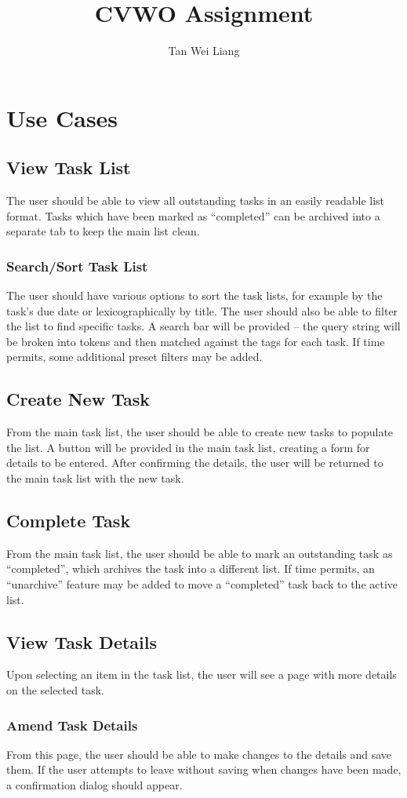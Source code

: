 \documentclass[12pt]{article}
\title{CVWO Assignment}
\author{Tan Wei Liang}
\begin{document}
    \section{Use Cases}
    	\subsection{View Task List}
The user should be able to view all outstanding tasks in an easily readable list format. Tasks which have been marked as “completed” can be archived into a separate tab to keep the main list clean.
    		\subsubsection{Search/Sort Task List}
The user should have various options to sort the task lists, for example by the task’s due date or lexicographically by title.
The user should also be able to filter the list to find specific tasks. A search bar will be provided – the query string will be broken into tokens and then matched against the tags for each task. 
If time permits, some additional preset filters may be added.
		\subsection{Create New Task}
From the main task list, the user should be able to create new tasks to populate the list. A button will be provided in the main task list, creating a form for details to be entered. After confirming the details, the user will be returned to the main task list with the new task.
		\subsection{Complete Task}
From the main task list, the user should be able to mark an outstanding task as “completed”, which archives the task into a different list. 
If time permits, an “unarchive” feature may be added to move a “completed” task back to the active list.
		\subsection{View Task Details}
Upon selecting an item in the task list, the user will see a page with more details on the selected task.
			\subsubsection{Amend Task Details}
From this page, the user should be able to make changes to the details and save them. If the user attempts to leave without saving when changes have been made, a confirmation dialog should appear.
\end{document}
